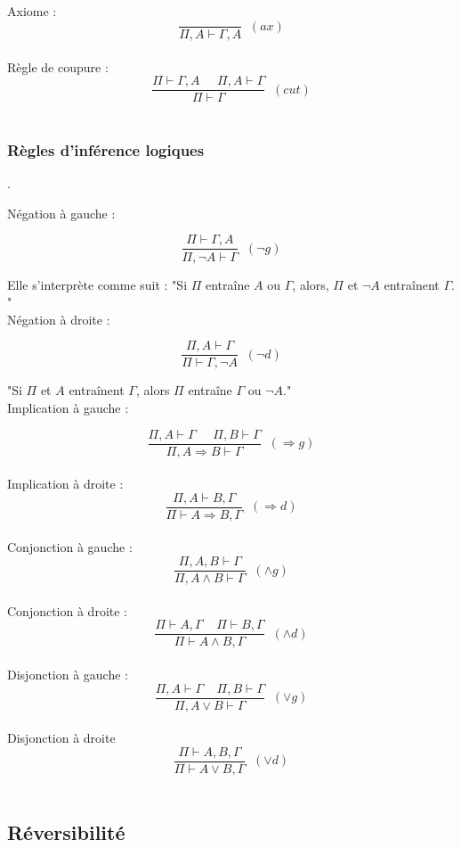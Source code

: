 \documentclass{article}
\begin{document}
Axiome :
$$\frac{}{\Pi,A \vdash \Gamma,A} \;\;(ax)$$
\\

Règle de coupure :
$$\frac{\Pi \vdash \Gamma, A \;\;\;\;\; \Pi,A \vdash \Gamma}{\Pi \vdash \Gamma} \; \; (cut)$$
\\

\subsubsection{Règles d'inférence logiques}
.

Négation à gauche :

$$\frac{\Pi \vdash \Gamma,A}{\Pi,\neg A \vdash \Gamma} \;\; (\neg g)$$

Elle s'interprète comme suit : "Si $\Pi$ entraîne $A$ ou $\Gamma$, alors, $\Pi$ et $\neg A$ entraînent $\Gamma$. "
\\

Négation à droite :

$$\frac{\Pi,A \vdash \Gamma}{\Pi \vdash \Gamma, \neg A} \;\; (\neg d)$$

"Si $\Pi$ et $A$ entraînent $\Gamma$, alors $\Pi$ entraîne $\Gamma$ ou $\neg A$."
\\

Implication à gauche :

$$\frac{\Pi,A \vdash \Gamma \;\;\;\;\; \Pi,B \vdash \Gamma}{\Pi,A \Rightarrow B \vdash \Gamma} \;\; (\Rightarrow g)$$
\\

Implication à droite :
$$\frac{\Pi,A \vdash B,\Gamma}{\Pi \vdash A \Rightarrow B, \Gamma} \;\; (\Rightarrow d)$$
\\

Conjonction à gauche :
$$\frac{\Pi,A,B \vdash \Gamma}{\Pi,A \wedge B \vdash \Gamma} \;\; (\wedge g)$$
\\

Conjonction à droite :
$$\frac{\Pi \vdash A, \Gamma \;\;\;\; \Pi \vdash B,\Gamma}{\Pi \vdash A \wedge B, \Gamma} \;\; (\wedge d)$$
\\

Disjonction à gauche :
$$\frac{\Pi,A \vdash \Gamma \;\;\;\; \Pi,B \vdash \Gamma}{\Pi, A \lor B \vdash \Gamma} \;\; (\lor g)$$
\\

Disjonction à droite
$$\frac{\Pi \vdash A,B,\Gamma}{\Pi \vdash A \lor B, \Gamma} \;\; (\lor d)$$
\\

\subsection{Réversibilité}
\end{document}
